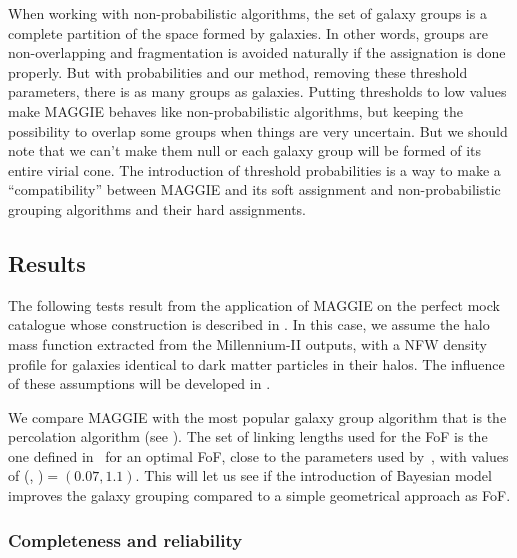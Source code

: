 When working with non-probabilistic algorithms, the set of galaxy groups is a
complete partition of the space formed by galaxies. In other words, groups are
non-overlapping and fragmentation is avoided naturally if the assignation is
done properly. But with probabilities and our method, removing these threshold
parameters, there is as many groups as galaxies. Putting thresholds to low
values make MAGGIE behaves like non-probabilistic algorithms, but keeping the
possibility to overlap some groups when things are very uncertain. But we
should note that we can't make them null or each galaxy group will be formed of
its entire virial cone. The introduction of threshold probabilities is a way to
make a ``compatibility'' between MAGGIE and its soft assignment and
non-probabilistic grouping algorithms and their hard assignments.

\subsection{Results}

The following tests result from the application of MAGGIE on the perfect mock
catalogue whose construction is described in . In this
case, we assume the halo mass function extracted from the Millennium-II
outputs, with a NFW density profile for galaxies identical to dark matter
particles in their halos. The influence of these assumptions will be developed
in .

We compare MAGGIE with the most popular galaxy group algorithm that is the
percolation algorithm (see ). The
set of linking lengths used for the FoF is the one defined in~\cite{Duarte+14}
for an optimal FoF, close to the parameters used by~\cite{Robotham+11}, with
values of (\bperp, \bpar)$=(0.07, 1.1)$. This will let us see if the
introduction of Bayesian model improves the galaxy grouping compared to a
simple geometrical approach as FoF.

\subsubsection{Completeness and reliability}

